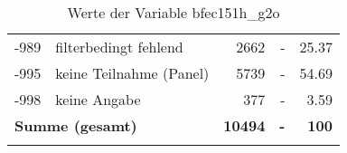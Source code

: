 \begin{longtable}{Xlrrr}
       -989 & filterbedingt fehlend & \num{2662} & - & \num[round-mode=places,round-precision=2]{25.37} \\

       -995 & keine Teilnahme (Panel) & \num{5739} & - & \num[round-mode=places,round-precision=2]{54.69} \\

       -998 & keine Angabe & \num{377} & - & \num[round-mode=places,round-precision=2]{3.59} \\

     \midrule
     \multicolumn{2}{l}{\textbf{Summe (gesamt)}} & \textbf{\num{10494}} & \textbf{-} & \textbf{\num{100}} \\
     \bottomrule
     \caption{Werte der Variable bfec151h\_g2o}
     \end{longtable}
     
